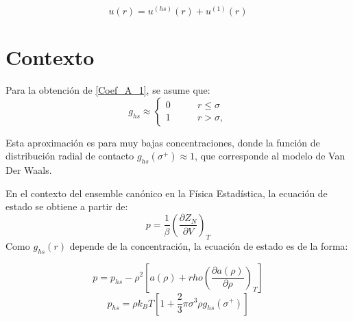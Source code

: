 \documentclass[12pt,letterpaper]{article}
\begin{document}
\begin{equation}
u(r) = u^{(hs)}(r) + u^{(1)}(r)
\label{PotInter_Base}
\end{equation}
\pagebreak

\section{Contexto}
Para la obtención de \eqref{Coef_A_1}, se asume que:
\begin{equation}
	 g_{hs}\approx
		\left\{
		\begin{aligned}
        	0 & \qquad r\leq \sigma\\
	        1 & \qquad r > \sigma ,
       \end{aligned}
       \right.
       \label{gdrhs}
\end{equation}

Esta aproximación es para muy bajas concentraciones, donde la función de distribución radial de contacto $g_{hs}(\sigma^+) \approx 1$, que corresponde al modelo de Van Der Waals.

En el contexto del ensemble canónico en la Física Estadística, la ecuación de estado se obtiene a partir de:
\begin{equation}
	p = \frac{1}{\beta} \left( \frac{\partial Z_N}{\partial V} \right)_{T}
	\label{EnsembleP}
\end{equation}
Como $g_{hs}(r)$ depende de la concentración, la ecuación de estado es de la forma:

\begin{equation}
	p = p_{hs} - \rho^2\left[ a(\rho) + rho \left( \frac{\partial a(\rho)}{\partial\rho} \right)_T \right] 
	\label{Press}
\end{equation}
\begin{equation}
	p_{hs} = \rho k_B T\left[ 1 +\frac{2}{3}\pi\sigma^3\rho g_{hs}(\sigma^+) \right]
	\label{PressHS}
\end{equation}

\pagebreak
\end{document}
